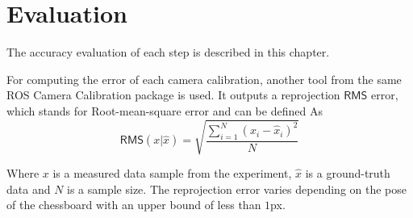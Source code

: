 \chapter{Evaluation}
\label{chapter:evaluation}

The accuracy evaluation of each step is described in this chapter.


For computing the error of each camera calibration, another tool from the same ROS Camera Calibration package is used.
It outputs a reprojection $\mathsf{RMS}$ error, which stands for Root-mean-square error and can be defined As
\begin{equation}
    \mathsf{RMS}(x | \hat{x} ) = \sqrt{\frac{\sum_{i=1}^{N}{(x_i - \hat{x}_i)^2}}{N}}
\end{equation}

Where $x$ is a measured data sample from the experiment, $\hat{x}$ is a ground-truth data and $N$ is a sample size.
The reprojection error varies depending on the pose of the chessboard with an upper bound of less than $1$px.
